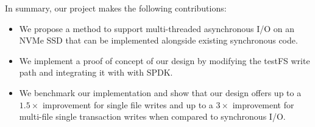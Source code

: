 \vspace{0.75em}
\noindent
In summary, our project makes the following contributions:
\begin{itemize}
  \item We propose a method to support multi-threaded asynchronous I/O on an
    NVMe SSD that can be implemented alongside existing synchronous code.
  \item We implement a proof of concept of our design by modifying the testFS
    write path and integrating it with with SPDK.
  \item We benchmark our implementation and show that our design offers up to a
    $1.5\times$ improvement for single file writes and up to a $3\times$
    improvement for multi-file single transaction writes when compared to
    synchronous I/O.
\end{itemize}
